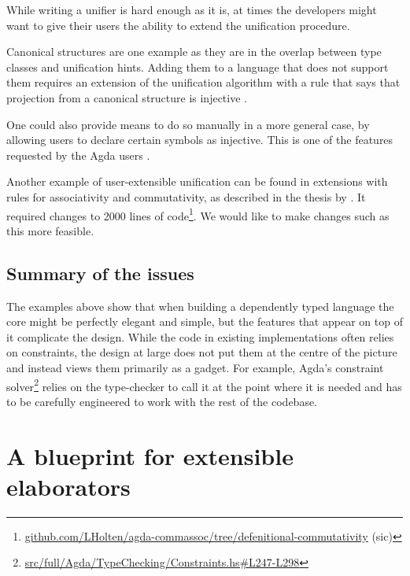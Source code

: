 While writing a unifier is hard enough as it is, at times the developers
might want to give their users the ability to extend the unification
procedure.

Canonical structures
\citep{saibiOutilsGeneriquesModelisation1999, mahboubiCanonicalStructuresWorking2013}
are one example as they are in the overlap between type classes and
unification hints. Adding them to a language that does not support them
requires an extension of the unification algorithm with a rule that says
that projection from a canonical structure is injective \citep[eq.
1]{mahboubiCanonicalStructuresWorking2013}.

One could also provide means to do so manually in a more general case,
by allowing users to declare certain symbols as injective. This is one
of the features requested by the Agda users
\citep{agdausersInjectiveUnificationPragma2023}.

Another example of user-extensible unification can be found in
extensions with rules for associativity and commutativity, as described
in the thesis by \citet{holtenDependentTypeCheckingModulo2023}. It
required changes to 2000 lines of code\footnote{\href{https://github.com/LHolten/agda-commassoc/tree/defenitional-commutativity}{github.com/LHolten/agda-commassoc/tree/defenitional-commutativity}
  (sic)}. We would like to make changes such as this more feasible.

\hypertarget{sec:summary-of-the-issues}{%
\subsection{Summary of the issues}\label{sec:summary-of-the-issues}}

The examples above show that when building a dependently typed language
the core might be perfectly elegant and simple, but the features that
appear on top of it complicate the design. While the code in existing
implementations often relies on constraints, the design at large does
not put them at the centre of the picture and instead views them
primarily as a gadget. For example, Agda's constraint solver\footnote{\href{https://github.com/agda/agda/blob/v2.6.4/src/full/Agda/TypeChecking/Constraints.hs\#L247-L298}{src/full/Agda/TypeChecking/Constraints.hs\#L247-L298}}
relies on the type-checker to call it at the point where it is needed
and has to be carefully engineered to work with the rest of the
codebase.

\hypertarget{sec:what-is-our-design-bringing-into-the-picture}{%
\section{A blueprint for extensible
elaborators}\label{sec:what-is-our-design-bringing-into-the-picture}}

